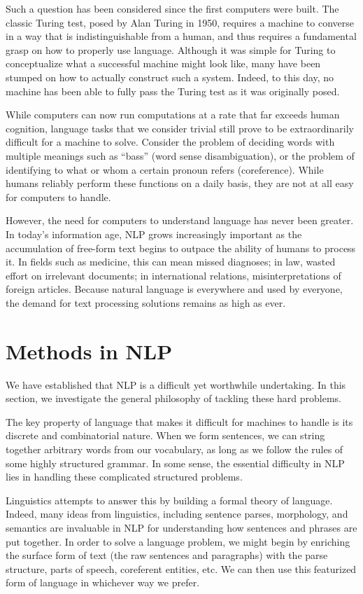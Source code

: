 \documentclass[12pt]{report}
\begin{document}
Such a question has been considered since the first computers were built. The classic Turing test, posed by Alan Turing in 1950, requires a machine to converse in a way that is indistinguishable from a human, and thus requires a fundamental grasp on how to properly use language.
Although it was simple for Turing to conceptualize what a successful machine might look like, many have been stumped on how to actually construct such a system.
Indeed, to this day, no machine has been able to fully pass the Turing test as it was originally posed.


While computers can now run computations at a rate that far exceeds human cognition, language tasks that we consider trivial still prove to be extraordinarily difficult for a machine to solve. Consider the problem of deciding words with multiple meanings such as ``bass'' (word sense disambiguation), or the problem of identifying to what or whom a certain pronoun refers (coreference). 
While humans reliably perform these functions on a daily basis, they are not at all easy for computers to handle.


However, the need for computers to understand language has never been greater.
In today's information age, NLP grows increasingly important as the accumulation of free-form text begins to outpace the ability of humans to process it. In fields such as medicine, this can mean missed diagnoses; in law, wasted effort on irrelevant documents; in international relations, misinterpretations of foreign articles.
Because natural language is everywhere and used by everyone, the demand for text processing solutions remains as high as ever.

\section{Methods in NLP}

We have established that NLP is a difficult yet worthwhile undertaking. In this section, we investigate the general philosophy of tackling these hard problems.

The key property of language that makes it difficult for machines to handle is its discrete and combinatorial nature. When we form sentences, we can string together arbitrary words from our vocabulary, as long as we follow the rules of some highly structured grammar. In some sense, the essential difficulty in NLP lies in handling these complicated structured problems.

Linguistics attempts to answer this by building a formal theory of language. Indeed, many ideas from linguistics, including sentence parses, morphology, and semantics are invaluable in NLP for understanding how sentences and phrases are put together.
In order to solve a language problem, we might begin by enriching the surface form of text (the raw sentences and paragraphs) with the parse structure, parts of speech, coreferent entities, etc. We can then use this featurized form of language in whichever way we prefer.
\end{document}
